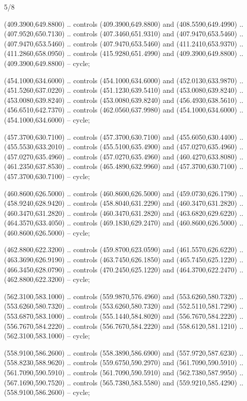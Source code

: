 \begin{flagdescription}{5/8}
\begin{scope}[shift={(m)}]
\begin{scope}[scale=\flagwidth/220,y=0.1mm, x=0.1mm, yscale=-1,shift={(-596,-360)}]
\begin{scope}[draw=black,line join=round,line cap=round,line width=0.381\lw]
\begin{scope}[fill=gold]
 (409.3900,649.8800) .. controls (409.3900,649.8800) and
  (408.5590,649.4990) .. (407.9520,650.7130) .. controls (407.3460,651.9310) and
  (407.9470,653.5460) .. (407.9470,653.5460) .. controls (407.9470,653.5460) and
  (411.2410,653.9370) .. (411.2860,658.0950) .. controls (415.9280,651.4990) and
  (409.3900,649.8800) .. (409.3900,649.8800) -- cycle;

 (454.1000,634.6000) .. controls (454.1000,634.6000) and
  (452.0130,633.9870) .. (451.5260,637.0220) .. controls (451.1230,639.5410) and
  (453.0080,639.8240) .. (453.0080,639.8240) .. controls (453.0080,639.8240) and
  (456.4930,638.5610) .. (456.6510,642.7370) .. controls (462.0560,637.9980) and
  (454.1000,634.6000) .. (454.1000,634.6000) -- cycle;

 (457.3700,630.7100) .. controls (457.3700,630.7100) and
  (455.6050,630.4400) .. (455.5530,633.2010) .. controls (455.5100,635.4900) and
  (457.0270,635.4960) .. (457.0270,635.4960) .. controls (457.0270,635.4960) and
  (460.4270,633.8080) .. (461.2350,637.8530) .. controls (465.4890,632.9960) and
  (457.3700,630.7100) .. (457.3700,630.7100) -- cycle;

 (460.8600,626.5000) .. controls (460.8600,626.5000) and
  (459.0730,626.1790) .. (458.9240,628.9420) .. controls (458.8040,631.2290) and
  (460.3470,631.2820) .. (460.3470,631.2820) .. controls (460.3470,631.2820) and
  (463.6820,629.6220) .. (464.3570,633.4050) .. controls (469.1830,629.2470) and
  (460.8600,626.5000) .. (460.8600,626.5000) -- cycle;

 (462.8800,622.3200) .. controls (459.8700,623.0590) and
  (461.5570,626.6220) .. (463.3690,626.9190) .. controls (463.7450,626.1850) and
  (465.7450,625.1220) .. (466.3450,628.0790) .. controls (470.2450,625.1220) and
  (464.3700,622.2470) .. (462.8800,622.3200) -- cycle;

 (562.3100,583.1000) .. controls (559.9870,576.4960) and
  (553.6260,580.7320) .. (553.6260,580.7320) .. controls (553.6260,580.7320) and
  (552.5110,581.7290) .. (553.6870,583.1000) .. controls (555.1440,584.8020) and
  (556.7670,584.2220) .. (556.7670,584.2220) .. controls (556.7670,584.2220) and
  (558.6120,581.1210) .. (562.3100,583.1000) -- cycle;

 (558.9100,586.2600) .. controls (558.3890,586.6900) and
  (557.9720,587.6230) .. (558.8230,588.9620) .. controls (559.6750,590.2970) and
  (561.7090,590.5910) .. (561.7090,590.5910) .. controls (561.7090,590.5910) and
  (562.7380,587.9950) .. (567.1690,590.7520) .. controls (565.7380,583.5580) and
  (559.9210,585.4290) .. (558.9100,586.2600) -- cycle;


\end{scope}
\end{scope}
\end{scope}
\end{scope}
\end{flagdescription}
